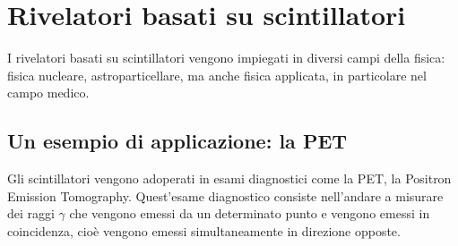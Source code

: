 \section{Rivelatori basati su scintillatori}
I rivelatori basati su scintillatori vengono impiegati in diversi campi della fisica: fisica nucleare, astroparticellare, ma anche fisica applicata, in particolare nel campo medico.



\subsection{Un esempio di applicazione: la PET}
Gli scintillatori vengono adoperati in esami diagnostici come la PET, la Positron Emission Tomography. Quest'esame diagnostico consiste nell'andare a misurare dei raggi $\gamma$ che vengono emessi da un determinato punto e vengono emessi in coincidenza, cioè vengono emessi simultaneamente in direzione opposte.

